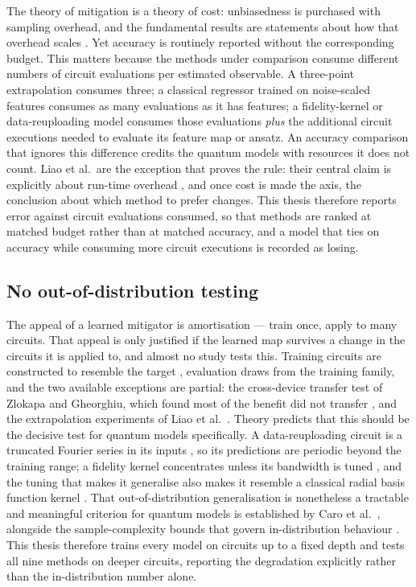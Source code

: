 \documentclass[Thesis.tex]{subfiles}
\begin{document}
The theory of mitigation is a theory of
cost: unbiasedness is purchased with sampling overhead, and the fundamental
results are statements about how that overhead scales
\cite{takagi2022fundamental,quek2024exponentially}. Yet accuracy is routinely
reported without the corresponding budget. This matters because the methods
under comparison consume different numbers of circuit evaluations per
estimated observable. A three-point extrapolation consumes three; a classical
regressor trained on noise-scaled features consumes as many evaluations as it
has features; a fidelity-kernel or data-reuploading model consumes those
evaluations \emph{plus} the additional circuit executions needed to evaluate
its feature map or ansatz. An accuracy comparison that ignores this difference
credits the quantum models with resources it does not count. Liao et al.\ are
the exception that proves the rule: their central claim is explicitly about
run-time overhead \cite{liao2024machine}, and once cost is made the axis, the
conclusion about which method to prefer changes. This thesis therefore reports
error against circuit evaluations consumed, so that methods are ranked at
matched budget rather than at matched accuracy, and a model that ties on
accuracy while consuming more circuit executions is recorded as losing.

\subsection{No out-of-distribution testing}

The appeal of a learned mitigator
is amortisation --- train once, apply to many circuits. That appeal is only
justified if the learned map survives a change in the circuits it is applied
to, and almost no study tests this. Training circuits are constructed to
resemble the target \cite{czarnik2021clifford,lowe2021unified}, evaluation
draws from the training family, and the two available exceptions are partial:
the cross-device transfer test of Zlokapa and Gheorghiu, which found most of
the benefit did not transfer \cite{zlokapa2020deep}, and the extrapolation
experiments of Liao et al.\ \cite{liao2024machine}. Theory predicts that this
should be the decisive test for quantum models specifically. A
data-reuploading circuit is a truncated Fourier series in its inputs
\cite{schuld2021effect}, so its predictions are periodic beyond the training
range; a fidelity kernel concentrates unless its bandwidth is tuned
\cite{thanasilp2024exponential,shaydulin2022importance,canatar2023bandwidth},
and the tuning that makes it generalise also makes it resemble a classical
radial basis function kernel \cite{florezablan2025similarity}. That
out-of-distribution generalisation is nonetheless a tractable and meaningful
criterion for quantum models is established by Caro et al.\
\cite{caro2023ood}, alongside the sample-complexity bounds that govern
in-distribution behaviour \cite{caro2022generalization}. This thesis therefore
trains every model on circuits up to a fixed depth and tests all nine methods
on deeper circuits, reporting the degradation explicitly rather than the
in-distribution number alone.
\end{document}
